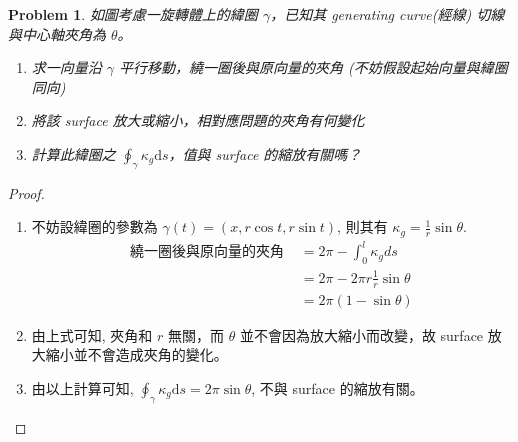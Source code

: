 \documentclass[10pt,a4paper]{article}
\newcounter{theProblemCounter}
\newtheorem{problem}[theProblemCounter]{Problem}
\begin{document}
\setcounter{theProblemCounter}{5}
\begin{problem}
如圖考慮一旋轉體上的緯圈 $\gamma$，已知其 generating curve(經線) 切線與中心軸夾角為 $\theta$。
\begin{enumerate}
\item[(a)] 求一向量沿 $\gamma$ 平行移動，繞一圈後與原向量的夾角 (不妨假設起始向量與緯圈同向)
\item[(b)] 將該 surface 放大或縮小，相對應問題的夾角有何變化
\item[(c)] 計算此緯圈之 $\oint_\gamma \kappa_g \mathrm{d}s$，值與 surface 的縮放有關嗎？
\end{enumerate}
\end{problem}
\begin{proof}
\begin{enumerate}
\item[(a)]
不妨設緯圈的參數為 $\gamma(t)=(x,r\cos t, r\sin t)$, 則其有 $\kappa_g=\frac{1}{r}\sin\theta$.
\begin{align*}
\textrm{繞一圈後與原向量的夾角 }&=2\pi-\int_0^l \kappa_g ds\\
&=2\pi-2\pi r\frac{1}{r}\sin\theta\\
&=2\pi(1-\sin\theta)
\end{align*}
\item[(b)]
由上式可知, 夾角和 $r$ 無關，而 $\theta$ 並不會因為放大縮小而改變，故 surface 放大縮小並不會造成夾角的變化。
\item[(c)]
由以上計算可知, $\oint_\gamma \kappa_g \mathrm{d}s=2\pi\sin\theta$, 不與 surface 的縮放有關。
\end{enumerate}
\end{proof}
\end{document}
